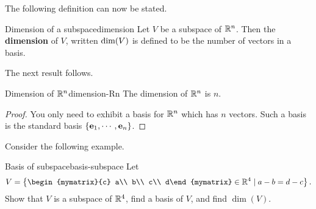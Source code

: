 The following definition can now be stated.

\begin{definition}{Dimension of a subspace}{dimension}
  Let $V$ be a subspace of $\mathbb{R}^{n}$. Then the \textbf{dimension }of
  $V$, written $\mbox{\rm dim}(V)$ is defined to be the number of vectors
  in a basis.
\end{definition}

The next result follows.

\begin{corollary}{Dimension of $\mathbb{R}^n$}{dimension-Rn}
  The dimension of $\mathbb{R}^{n}$ is $n$.
\end{corollary}

\begin{proof}
  You only need to exhibit a basis for $\mathbb{R}^{n}$ which has $n$
  vectors. Such a basis is the standard basis
  $\left\{\mbox{\bf e}_{1},\cdots , \mbox{\bf e}_{n}\right\}$.
\end{proof}

Consider the following example.

\begin{example}{Basis of subspace}{basis-subspace}
  Let 
  \begin{equation*}
    V=\set{
      \begin{mymatrix}{c} a\\ b\\ c\\ d\end{mymatrix}\in\R^4 \mid
      a-b=d-c
    }.
  \end{equation*}
  Show that $V$ is a subspace of $\mathbb{R}^4$, find a basis of $V$, and find
  $\dim(V)$.
\end{example}

